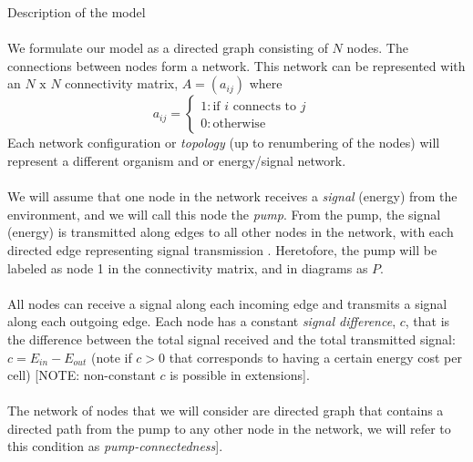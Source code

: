 \documentclass{amsart}
\theoremstyle{plain}
\numberwithin{equation}{section}
\begin{document}
Description of the model\\
\\
We formulate our model as a directed graph consisting of $N$ nodes. The connections between nodes form a network. This network can be represented with an $N \text{ x } N$ connectivity matrix, $A=(a_{ij})$ where \begin{displaymath}
   a_{ij}= \left\{
     \begin{array}{lr}
       1 : \text{if }i \text{ connects to } j &\\
       0 : \text{otherwise}&
     \end{array}
   \right.
\end{displaymath}
Each network configuration or \textit{topology} (up to renumbering of the nodes) will represent a different organism and or energy/signal network. 
\\
\\
We will assume that one node in the network receives a \textit{signal} (energy) from the environment, and we will call this node the \textit{pump}. From the pump, the signal (energy) is transmitted along edges to all other nodes in the network, with each directed edge representing signal transmission . Heretofore, the pump will be labeled as node 1 in the connectivity matrix, and in diagrams as $P$.
\\
\\
All nodes can receive a signal along each incoming edge and transmits a signal along each outgoing edge. Each node has a constant \textit{signal difference}, $c$, that is the difference between the total signal received and the total transmitted signal: $c=E_{in}-E_{out}$ (note if $c>0$ that corresponds to having a certain energy cost per cell) [NOTE: non-constant $c$ is possible in extensions]. 
\\
\\
The network of nodes that we will consider are directed graph that contains a directed path from the pump to any other node in the network, we will refer to this condition as \textit{pump-connectedness}]. 
\end{document}
